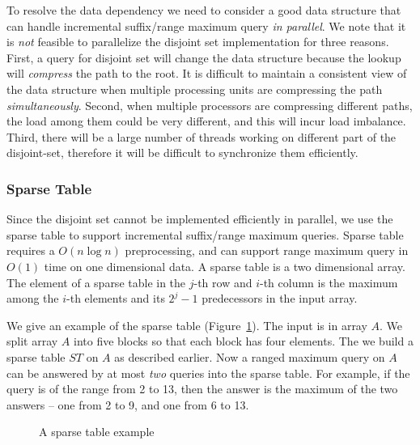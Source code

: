 To resolve the data dependency we need to consider a good data
structure that can handle incremental suffix/range maximum query {\em
  in parallel}.  We note that it is {\em not} feasible to parallelize
the disjoint set implementation for three reasons.  First, a query for
disjoint set will change the data structure because the lookup will
{\em compress} the path to the root.  It is difficult to maintain a
consistent view of the data structure when multiple processing units
are compressing the path {\em simultaneously}.  Second, when multiple
processors are compressing different paths, the load among them could
be very different, and this will incur load imbalance. Third, there
will be a large number of threads working on different part of the
disjoint-set, therefore it will be difficult to synchronize them
efficiently.

\subsubsection{Sparse Table}

Since the disjoint set cannot be implemented efficiently in parallel,
we use the sparse table to support incremental suffix/range maximum
queries.  Sparse table~\cite{Berkman1993RecursiveSP} requires a $O(n
\log n)$ preprocessing, and can support range maximum query in $O(1)$
time on one dimensional data.  A sparse table is a two dimensional
array.  The element of a sparse table in the $j$-th row and $i$-th
column is the maximum among the $i$-th elements and its $2^j - 1$
predecessors in the input array.

We give an example of the sparse table
(Figure~\ref{fig:interval-decomposition}).  The input is in array
$A$. We split array $A$ into five blocks so that each block has four
elements.  The we build a sparse table $ST$ on $A$ as described
earlier.  Now a ranged maximum query on $A$ can be answered by at most
{\em two} queries into the sparse table.  For example, if the query is
of the range from 2 to 13, then the answer is the maximum of the two
answers -- one from 2 to 9, and one from 6 to 13.

\begin{figure}[!thb]
  \centering {} 
  \caption{A sparse table example}
  \label{fig:interval-decomposition}
\end{figure}

